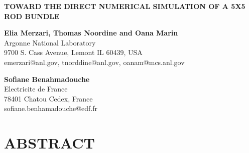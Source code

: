 \documentclass[11pt,letterpaper,english]{article}
\begin{document}
\vspace*{-0.45in}
\begin{center}
{\Large\centering\bf TOWARD THE DIRECT NUMERICAL SIMULATION OF A 5X5 ROD BUNDLE }

\vspace{3pt}

{\bf \large Elia Merzari, Thomas Noordine and Oana Marin} \\
\large Argonne National Laboratory \\
\large 9700 S. Cass Avenue, Lemont IL 60439, USA \\
{\color{brown} emerzari@anl.gov,  tnorddine@anl.gov, oanam@mcs.anl.gov}

\vspace{3pt}

{\bf \large Sofiane Benahmadouche} \\
\large  Electricite de France \\
\large 78401 Chatou Cedex, France \\
{\color{brown}  sofiane.benhamadouche@edf.fr}

\end{center}



\normalsize

\section*{ABSTRACT}
\end{document}
